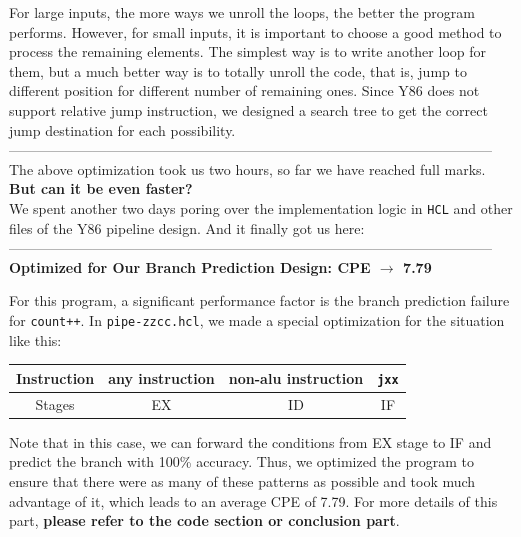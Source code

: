 \documentclass[12pt,a4paper]{article}
\begin{document}
For large inputs, the more ways we unroll the loops, the better the program performs. However, for 
small inputs, it is important to choose a good method to process the remaining elements. The simplest 
way is to write another loop for them, but a much better way is to totally unroll the code, that is, 
jump to different position for different number of remaining ones. Since Y86 does not support relative 
jump instruction, we designed a search tree to get the correct jump destination for each possibility.
\\
--------------------------------------------------------------------------------------------------------\\
The above optimization took us two hours, so far we have reached full marks.\\
\textbf{But can it be even faster?}\\
We spent another two days poring over the implementation logic in \texttt{HCL} and other files of the Y86 pipeline design. And it finally got us here:\\
--------------------------------------------------------------------------------------------------------\\
{\color{red}\textbf{Optimized for Our Branch Prediction Design: CPE $\rightarrow$ 7.79}} 

For this program, a significant performance factor is the branch prediction failure for \texttt{count++}.
In \texttt{pipe-zzcc.hcl}, we made a special optimization for the situation like this:
\begin{center}

\begin{tabular}{|c|c|c|c|}
        \hline Instruction&any instruction&non-alu instruction&\texttt{jxx}\\
        \hline Stages&EX&ID&IF\\
        \hline
\end{tabular}
\end{center}

Note that in this case, we can forward the conditions from EX stage to IF and predict the branch with 100\% accuracy. 
Thus, we optimized the program to ensure that there were as many of these patterns as 
possible and took much advantage of it, which leads to an average CPE of 7.79. For more details of this part, \textbf{please refer to the code section or conclusion part}.
\end{document}
